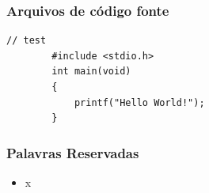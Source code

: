 \documentclass{beamer}
\begin{document}
\begin{frame}
	\frametitle{Arquivos de código fonte}
	
\end{frame}


\begin{frame}[fragile]
	\begin{lstlisting}[style=customc]
		// test
		#include <stdio.h>
		int main(void)
		{
			printf("Hello World!");
		}
	\end{lstlisting}
\end{frame}

\begin{frame}
	\frametitle{Palavras Reservadas}
	\begin{itemize}
		\item x
	\end{itemize}
\end{frame}

\begin{frame}
	\frametitle{}
	\begin{columns}[T] %
		\begin{column}{.50\textwidth}
		\end{column}%
		\hfill%
		\begin{column}{.50\textwidth}
		\end{column}%
	\end{columns}
\end{frame}
\end{document}
